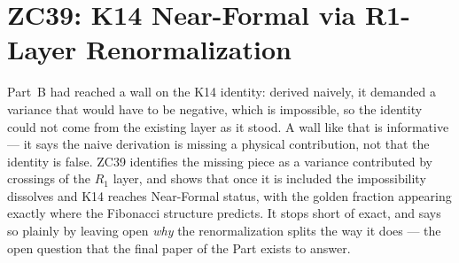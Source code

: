 \documentclass[12pt, a4paper]{article}
\begin{document}
\section{ZC39: K14 Near-Formal via R1-Layer Renormalization}
\label{sec:zc39-k14-renorm}

Part~B had reached a wall on the K14 identity: derived naively, it demanded a
variance that would have to be negative, which is impossible, so the identity
could not come from the existing layer as it stood. A wall like that is
informative --- it says the naive derivation is missing a physical contribution,
not that the identity is false. ZC39 identifies the missing piece as a variance
contributed by crossings of the $R_1$ layer, and shows that once it is included
the impossibility dissolves and K14 reaches Near-Formal status, with the golden
fraction appearing exactly where the Fibonacci structure predicts. It stops short
of exact, and says so plainly by leaving open \emph{why} the renormalization
splits the way it does --- the open question that the final paper of the Part
exists to answer.



\sloppy
\end{document}
